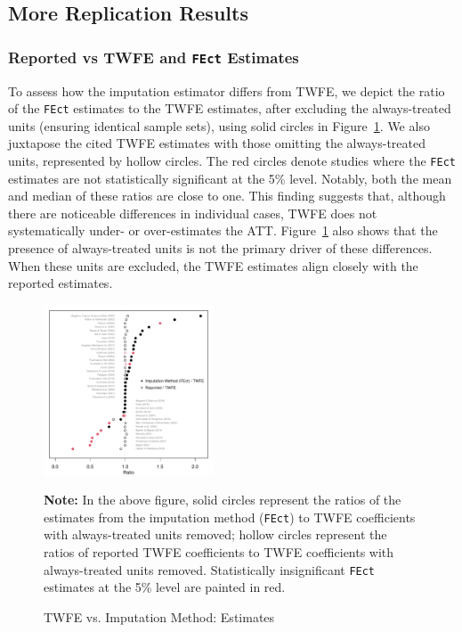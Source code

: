 \documentclass[12pt]{article}
\begin{document}
\clearpage

\subsection{More Replication Results}

\subsubsection{Reported vs TWFE and \texttt{FEct} Estimates}

To assess how the imputation estimator differs from TWFE, we depict the ratio of the \texttt{FEct} estimates to the TWFE estimates, after excluding the always-treated units (ensuring identical sample sets), using solid circles in Figure~\ref{fg:all.ratio}. We also juxtapose the cited TWFE estimates with those omitting the always-treated units, represented by hollow circles. The red circles denote studies where the \texttt{FEct} estimates are not statistically significant at the 5\% level. Notably, both the mean and median of these ratios are close to one. This finding suggests that, although there are noticeable differences in individual cases, TWFE does not systematically under- or over-estimates the ATT. 
Figure~\ref{fg:all.ratio} also shows that the presence of always-treated units is not the primary driver of these differences. When these units are excluded, the TWFE estimates align closely with the reported estimates.


\begin{figure}[!ht]
  \caption{TWFE vs. Imputation Method: Estimates}\label{fg:all.ratio}
  \begin{center}
  \includegraphics[width = 0.45\textwidth]{summary/fect_v_twfe_est.pdf}
    \end{center}
  {\footnotesize\textbf{Note:} In the above figure, solid circles represent the ratios of the estimates from the imputation method (\texttt{FEct}) to TWFE coefficients with always-treated units removed; hollow circles represent the ratios of reported TWFE coefficients to TWFE coefficients with always-treated units removed. Statistically insignificant \texttt{FEct} estimates at the 5\% level are painted in red. 
  }
  \vspace{-0.5em}
\end{figure}
\end{document}
